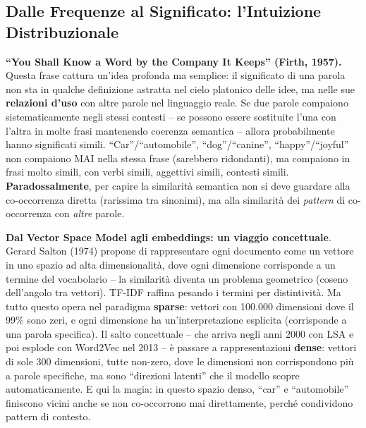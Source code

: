 \documentclass[12pt,a4paper]{article}
\begin{document}
\subsection{Dalle Frequenze al Significato: l'Intuizione Distribuzionale}

\begin{defbox}
\textbf{``You Shall Know a Word by the Company It Keeps'' (Firth, 1957).}
Questa frase cattura un'idea profonda ma semplice: il significato di una parola non sta in qualche definizione astratta nel cielo platonico delle idee, ma nelle sue \textbf{relazioni d'uso} con altre parole nel linguaggio reale. Se due parole compaiono sistematicamente negli stessi contesti -- se possono essere sostituite l'una con l'altra in molte frasi mantenendo coerenza semantica -- allora probabilmente hanno significati simili. ``Car''/``automobile'', ``dog''/``canine'', ``happy''/``joyful'' non compaiono MAI nella stessa frase (sarebbero ridondanti), ma compaiono in frasi molto simili, con verbi simili, aggettivi simili, contesti simili. \textbf{Paradossalmente}, per capire la similarit\`a semantica non si deve guardare alla co-occorrenza diretta (rarissima tra sinonimi), ma alla similarit\`a dei \emph{pattern} di co-occorrenza con \emph{altre} parole.
\end{defbox}

\textbf{Dal Vector Space Model agli embeddings: un viaggio concettuale}. Gerard Salton (1974) propone di rappresentare ogni documento come un vettore in uno spazio ad alta dimensionalit\`a, dove ogni dimensione corrisponde a un termine del vocabolario -- la similarit\`a diventa un problema geometrico (coseno dell'angolo tra vettori). TF-IDF raffina pesando i termini per distintivit\`a. Ma tutto questo opera nel paradigma \textbf{sparse}: vettori con 100.000 dimensioni dove il 99\% sono zeri, e ogni dimensione ha un'interpretazione esplicita (corrisponde a una parola specifica). Il salto concettuale -- che arriva negli anni 2000 con LSA e poi esplode con Word2Vec nel 2013 -- \`e passare a rappresentazioni \textbf{dense}: vettori di sole 300 dimensioni, tutte non-zero, dove le dimensioni non corrispondono pi\`u a parole specifiche, ma sono ``direzioni latenti'' che il modello scopre automaticamente. E qui la magia: in questo spazio denso, ``car'' e ``automobile'' finiscono vicini anche se non co-occorrono mai direttamente, perch\'e condividono pattern di contesto.
\end{document}
